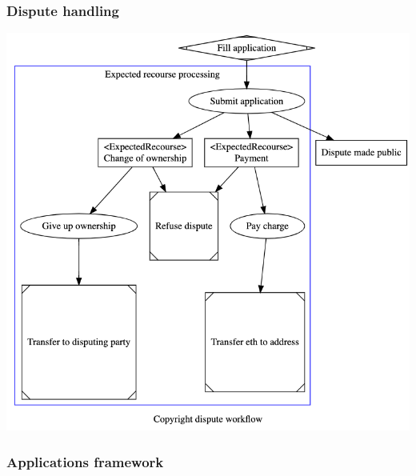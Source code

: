 \documentclass[12pt]{article}
\begin{document}
\subsubsection{Dispute handling}
\includegraphics[width=\textwidth,height=\textheight,keepaspectratio]{images/operational/dispute-workflow}

\subsubsection{Applications framework}
\end{document}
